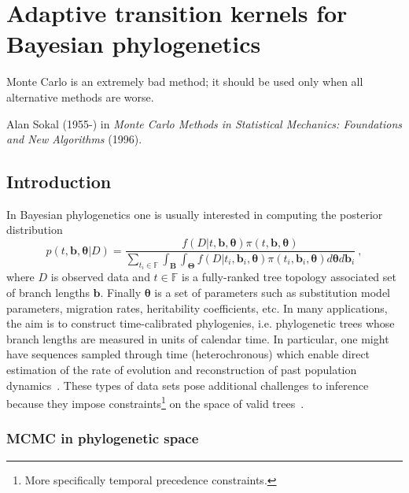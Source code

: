 \chapter{Adaptive transition kernels for Bayesian phylogenetics}
\epigraph{ 
Monte Carlo is an extremely bad method; it should be used only when all alternative methods are worse.
}{Alan Sokal (1955-) in \textit{Monte Carlo Methods in Statistical Mechanics: Foundations and New Algorithms} (1996).}


\section{Introduction}	
\label{sec:intro_ch2}

In Bayesian phylogenetics one is usually interested in computing the posterior distribution
\begin{equation}
\label{eq:posterior}
 p(t, \boldsymbol b, \boldsymbol \theta | D) = \frac{f(D | t, \boldsymbol b, \boldsymbol \theta ) \pi(t, \boldsymbol b, \boldsymbol \theta )}{\sum_{t_i \in \mathbb{F}} \int_{\boldsymbol B}\int_{\boldsymbol \Theta} f(D | t_i, \boldsymbol b_i, \boldsymbol \theta ) \pi(t_i, \boldsymbol b_i, \boldsymbol \theta ) d\boldsymbol\theta d\boldsymbol b_i}\:,
\end{equation}
where $D$ is observed data and $t \in \mathbb{F}$ is a fully-ranked tree topology associated set of branch lengths $\boldsymbol b$. %
Finally $\boldsymbol \theta$ is a set of parameters such as substitution model parameters, migration rates, heritability coefficients, etc.
In many applications, the aim is to construct time-calibrated phylogenies, i.e. phylogenetic trees whose branch lengths are measured in units of calendar time.
In particular, one might have sequences sampled through time (heterochronous) which enable direct estimation of the rate of evolution and reconstruction of past population dynamics~\citep{Drummond2002, Drummond2005}.
These types of data sets pose additional challenges to inference because they impose constraints\footnote{More specifically temporal precedence constraints.} on the space of valid trees~\citep{Stadler2013}.

\subsection{MCMC in phylogenetic space}
\label{sec:tree_mcmc}

